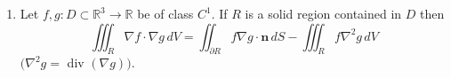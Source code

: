 \documentclass{article}
\newcommand{\divt}{\text{div}}
\begin{document}
\begin{enumerate}
\begin{enumerate}
\begin{enumerate}[label=(\roman*)]
            \[\divt (f \boldsymbol F) = \sum_{i=1}^n \frac{\partial fF_i}{\partial x_i} = \sum_{i=1}^n \frac{\partial f}{\partial x_i} F_i + \frac{\partial F_i}{\partial x_i}f = \sum_{i=1}^n \frac{\partial f}{\partial x_i} F_i + f \sum_{i=1}^n\frac{\partial F_i}{\partial x_i} = \nabla f \cdot \boldsymbol F + f \divt \boldsymbol F \]
            \item $\Delta (f g) =f \Delta g + g \Delta f + 2($grad$f)\cdot ( $grad$ g).$
            \begin{proof}
                \begin{align*}
                    \Delta(fg) &= \sum_{i=1}^n\frac{\partial^2fg}{\partial^2 x_i } \\
                    &= \sum_{i=1}^n\frac{\partial}{\partial x_i } \bigg[ \frac{\partial f}{\partial x_i }g  + \frac{\partial g}{\partial x_i }f\bigg] \\
                    &= \sum_{i=1}^n \bigg[ \frac{\partial f}{\partial^2 x_i }g  + \bigg( \frac{\partial f}{\partial x_i } \cdot \frac{\partial g}{\partial x_i } \bigg) + \frac{\partial g}{\partial^2 x_i }f + \bigg( \frac{\partial f}{\partial x_i } \cdot \frac{\partial g}{\partial x_i } \bigg)\bigg] \\
                    &= g\sum_{i=1}^n \frac{\partial f}{\partial^2 x_i }  + 2 \sum_{i=1}^n \bigg( \frac{\partial f}{\partial x_i } \cdot \frac{\partial g}{\partial x_i } \bigg) + f\sum_{i=1}^n \frac{\partial g}{\partial^2 x_i } \\
                    &= g \Delta f  + 2[\nabla f \cdot \nabla g] + f \Delta g\\
                \end{align*}
            \end{proof}
        \end{enumerate}
        \item Let $f,g:D \subset \mathbb{R}^3 \rightarrow \mathbb{R}$ be of class $C^1$. If $R$ is a solid region contained in $D$ then
        \[\iiint_R \nabla f \cdot \nabla g \, dV = \iint_{\partial R} f \nabla  g \cdot \boldsymbol n \, dS - \iiint_R f \nabla^2 g \, dV\] 
        $(\nabla^2 g = $ div $(\nabla g))$.


\end{enumerate}
\end{enumerate}
\end{document}
